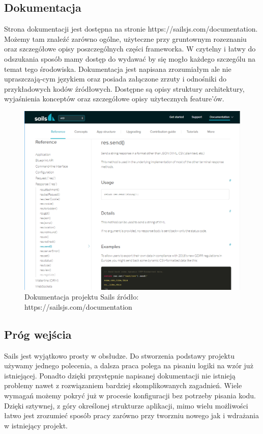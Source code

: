 \documentclass[12pt]{report}
\begin{document}
    \subsection{Dokumentacja}
      Strona dokumentacji jest dostępna na stronie https://sailsjs.com/documentation.
      Możemy tam znaleźć zarówno ogólne, użyteczne przy gruntownym rozeznaniu oraz szczegółowe opisy poszczególnych części frameworka.
      W czytelny i łatwy do odszukania sposób mamy dostęp do wydawać by się mogło każdego szczególu na temat tego środowiska.
      Dokumentacja jest napisana zrozumiałym ale nie upraszczają-cym językiem oraz posiada załączone zrzuty i odnośniki do przykładowych kodów źródłowych.
      Dostępne są opisy struktury architektury, wyjaśnienia konceptów oraz szczegółowe opisy użytecznych feature'ów.
      \begin{figure}[!hb]
        \centering
        \includegraphics[width=\textwidth,height=\textheight,keepaspectratio]{doc_sails.png} 
        \caption{Dokumentacja projektu Sails \newline źródło: https://sailsjs.com/documentation}
      \end{figure}

    \subsection{Próg wejścia}
      Sails jest wyjątkowo prosty w obsłudze.
      Do stworzenia podstawy projektu używamy jednego polecenia, a dalsza praca polega na pisaniu logiki na wzór już istniejącej.
      Ponadto dzięki przystępnie napisanej dokumentacji nie istnieją problemy nawet z rozwiązaniem bardziej skomplikowanych zagadnień.
      Wiele wymagań możemy pokryć już w procesie konfiguracji bez potrzeby pisania kodu.
      Dzięki sztywnej, z góry określonej strukturze aplikacji, mimo wielu możliwości łatwo jest zrozumieć sposób pracy zarówno przy tworzniu nowego jak i wdrażania w istniejący projekt. 
\end{document}
